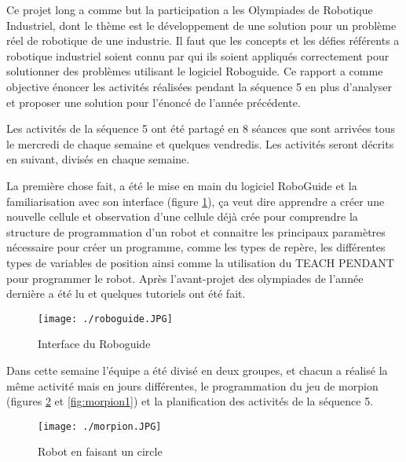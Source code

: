 \documentclass[a4paper,twoside]{articlewithlogo}
\begin{document}
\large
\renewcommand{\figurename}{Figure}

\conteudo
\newpage
{}
Ce projet long a comme but la participation a les Olympiades de Robotique Industriel, dont le thème est le développement de une solution pour un problème réel de robotique de une industrie. Il faut que les concepts et les défies référents a robotique industriel soient connu par qui ils soient appliqués correctement pour solutionner des problèmes utilisant le logiciel Roboguide. Ce rapport a comme objective énoncer les activités réalisées pendant la séquence 5 en plus d’analyser et proposer une solution pour l'énoncé de l'année précédente.




Les activités de la séquence 5 ont été partagé en 8 séances que sont arrivées tous le mercredi de chaque semaine et quelques vendredis. Les activités seront décrits en suivant, divisés en chaque semaine.
	
	La première chose fait, a été le mise en main du logiciel RoboGuide et la familiarisation avec son interface (figure \ref{fig:roboguide}), ça veut dire apprendre a créer une nouvelle cellule et observation d'une cellule déjà crée pour comprendre la structure de programmation d'un robot et connaitre les principaux paramètres nécessaire pour créer un programme, comme les types de repère, les différentes types de variables de position ainsi comme la utilisation du TEACH PENDANT pour programmer le robot. Après l'avant-projet des  olympiades  de l'année dernière a été lu et quelques tutoriels ont été fait. 
	
	\begin{figure}[H]
		\begin{center}	
			\texttt{[image: ./roboguide.JPG]}
			\caption{Interface du Roboguide}
			\label{fig:roboguide}
		\end{center}
	\end{figure}
	
	\pagebreak
	Dans cette semaine l'équipe a été divisé en deux groupes, et chacun a réalisé la même activité mais en jours différentes, le programmation du jeu de morpion (figures \ref{fig:morpion} et \ref{fig:morpion1}) et la planification des activités de la séquence 5. 
	
	\begin{figure}[H]
		\begin{center}	
			\texttt{[image: ./morpion.JPG]}
			\caption{Robot en faisant un circle}
			\label{fig:morpion}
		\end{center}
	\end{figure}
	
\end{document}
